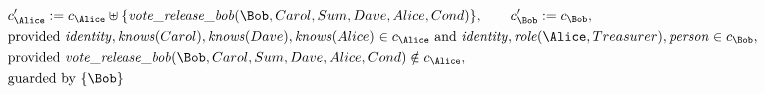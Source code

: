 \begin{align*}
&
c'_
{
\Alice
}
 := 
c_
{
\Alice
}
 \uplus 
\{
\mathit{\detokenize{
vote_release_bob
}}
(
\Bob
,
Carol
,
Sum
,
Dave
,
Alice
,
Cond
)
\}
, \qquad 
c'_
{
\Bob
}
 := 
c_
{
\Bob
}
,\\
&
\text{provided } 
\mathit{\detokenize{
identity
}}
,
\mathit{\detokenize{
knows
}}
(
Carol
)
,
\mathit{\detokenize{
knows
}}
(
Dave
)
,
\mathit{\detokenize{
knows
}}
(
Alice
)
 \in c_
{
\Alice
}
 \text{ and } 
\mathit{\detokenize{
identity
}}
,
\mathit{\detokenize{
role
}}
(
\Alice
,
Treasurer
)
,
\mathit{\detokenize{
person
}}
 \in c_
{
\Bob
}
,\\
&
\text{provided } 
\mathit{\detokenize{
vote_release_bob
}}
(
\Bob
,
Carol
,
Sum
,
Dave
,
Alice
,
Cond
)
 \notin c_
{
\Alice
}
,\\
&
\text{guarded by } \{
\Bob
\}
\end{align*}

